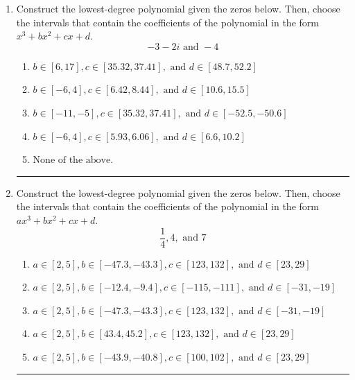 \documentclass[14pt]{extbook}
\newcommand{\litem}[1]{\item#1\hspace*{-1cm}\rule{\textwidth}{0.4pt}}
\begin{document}
\begin{enumerate}
{\begin{enumerate}[label=\Alph*.]
\end{enumerate} }
\litem{
Construct the lowest-degree polynomial given the zeros below. Then, choose the intervals that contain the coefficients of the polynomial in the form $x^3+bx^2+cx+d$.\[ -3 - 2 i \text{ and } -4 \]\begin{enumerate}[label=\Alph*.]
\item \( b \in [6, 17], c \in [35.32, 37.41], \text{ and } d \in [48.7, 52.2] \)
\item \( b \in [-6, 4], c \in [6.42, 8.44], \text{ and } d \in [10.6, 15.5] \)
\item \( b \in [-11, -5], c \in [35.32, 37.41], \text{ and } d \in [-52.5, -50.6] \)
\item \( b \in [-6, 4], c \in [5.93, 6.06], \text{ and } d \in [6.6, 10.2] \)
\item \( \text{None of the above.} \)

\end{enumerate} }
\litem{
Construct the lowest-degree polynomial given the zeros below. Then, choose the intervals that contain the coefficients of the polynomial in the form $ax^3+bx^2+cx+d$.\[ \frac{1}{4}, 4, \text{ and } 7 \]\begin{enumerate}[label=\Alph*.]
\item \( a \in [2, 5], b \in [-47.3, -43.3], c \in [123, 132], \text{ and } d \in [23, 29] \)
\item \( a \in [2, 5], b \in [-12.4, -9.4], c \in [-115, -111], \text{ and } d \in [-31, -19] \)
\item \( a \in [2, 5], b \in [-47.3, -43.3], c \in [123, 132], \text{ and } d \in [-31, -19] \)
\item \( a \in [2, 5], b \in [43.4, 45.2], c \in [123, 132], \text{ and } d \in [23, 29] \)
\item \( a \in [2, 5], b \in [-43.9, -40.8], c \in [100, 102], \text{ and } d \in [23, 29] \)


\end{enumerate}}
\end{enumerate}
\end{document}
